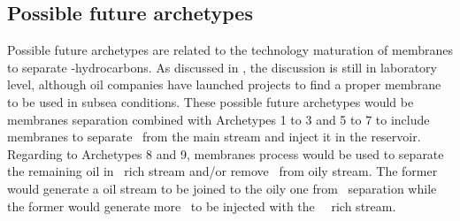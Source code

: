 \subsection{Possible future archetypes}
Possible future archetypes are related to the technology maturation of membranes to separate \CO-hydrocarbons. As discussed in , the discussion is still in laboratory level, although oil companies have launched projects to find a proper membrane to be used in subsea conditions. These possible future archetypes would be membranes separation combined with Archetypes 1 to 3 and 5 to 7 to include membranes to separate \CO~from the main stream and inject it in the reservoir. Regarding to Archetypes 8 and 9, membranes process would be used to separate the remaining oil in \CO~rich stream and/or remove \CO~from oily stream. The former would generate a oil stream to be joined to the oily one from \HiSep~separation while the former would generate more \CO~to be injected with the \HiSep~\CO~rich stream.  

\newpage
